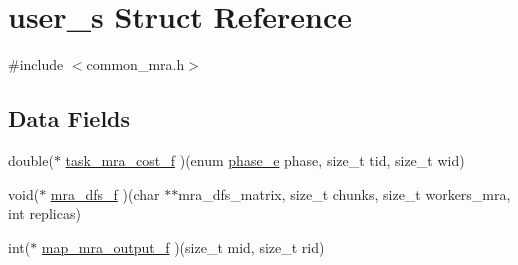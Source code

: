 \hypertarget{structuser__s}{\section{user\-\_\-s \-Struct \-Reference}
\label{structuser__s}
}


{\ttfamily \#include $<$common\-\_\-mra.\-h$>$}

\subsection*{\-Data \-Fields}
\begin{DoxyCompactItemize}
\item 
double($\ast$ \hyperlink{structuser__s_aa32af3ea6ee92e53a04476911d65f2c1}{task\-\_\-mra\-\_\-cost\-\_\-f} )(enum \hyperlink{mra_8h_afa14b6e068c0e0b8557777e16f2582f2}{phase\-\_\-e} phase, size\-\_\-t tid, size\-\_\-t wid)
\item 
void($\ast$ \hyperlink{structuser__s_a832e7d465f899e75aa7fe1d72987c5d2}{mra\-\_\-dfs\-\_\-f} )(char $\ast$$\ast$mra\-\_\-dfs\-\_\-matrix, size\-\_\-t chunks, size\-\_\-t workers\-\_\-mra, int replicas)
\item 
int($\ast$ \hyperlink{structuser__s_ab9a47b1668a675fb95ca6489d1da13a7}{map\-\_\-mra\-\_\-output\-\_\-f} )(size\-\_\-t mid, size\-\_\-t rid)
\end{DoxyCompactItemize}



